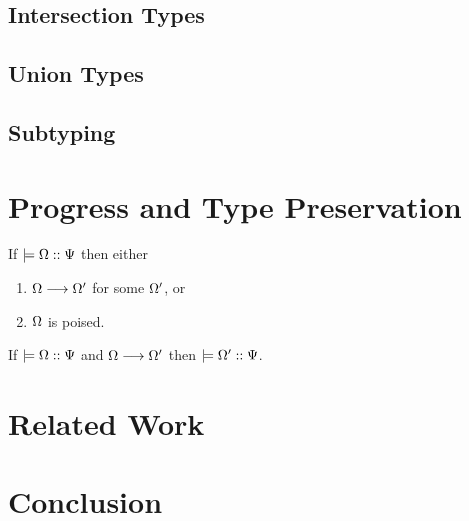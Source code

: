 \documentclass[a4paper,USenglish]{lipics-v2016}
\begin{document}
  \subsection{Intersection Types}

  \subsection{Union Types}

  \subsection{Subtyping}

\section{Progress and Type Preservation}

\begin{theorem}[Progress]
If $\models {\Omega} :: {\Psi}$ then either
\begin{enumerate}
  \item $\Omega \longrightarrow \Omega'$ for some $\Omega'$, or
  \item $\Omega$ is poised.
\end{enumerate}
\end{theorem}


\begin{theorem}[Preservation]
If $\models {\Omega} :: {\Psi}$ and $\Omega \longrightarrow \Omega'$ then $\models {\Omega'} :: {\Psi}$.
\end{theorem}

\section{Related Work}

\section{Conclusion}


\appendix





\end{document}
